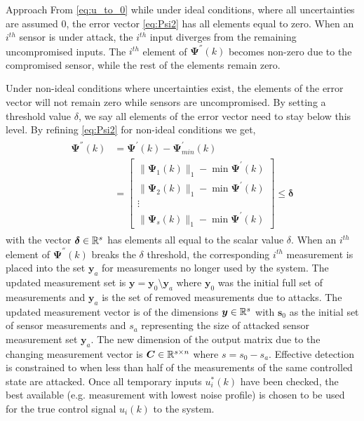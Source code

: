 \begin{section}{Approach}
From \eqref{eq:u_to_0} while under ideal conditions, where all uncertainties are assumed 0, the error vector \eqref{eq:Psi2} has all elements equal to zero. When an $i^{th}$ sensor is under attack, the $i^{th}$ input diverges from the remaining uncompromised inputs. The $i^{th}$ element of $\bm{\Psi}^{''}(k)$ becomes non-zero due to the compromised sensor, while the rest of the elements remain zero. 

Under non-ideal conditions where uncertainties exist, the elements of the error vector will not remain zero while sensors are uncompromised. By setting a threshold value $\delta$, we say all elements of the error vector need to stay below this level. By refining \eqref{eq:Psi2} for non-ideal conditions we get,
    \begin{align}
    \begin{split}
    \label{eq:Psi2_nonideal}
	\bm{\Psi^{''}}(k)&=\bm{\Psi^{'}}(k)-\bm{\Psi}^{'}_{min}(k) \\
	& =\begin{bmatrix} \lVert{\bm{\Psi}_1(k)}\rVert_1 - \min \bm{\Psi}^{'}(k)\\ \lVert{\bm{\Psi}_2(k)}\rVert_1 - \min \bm{\Psi}^{'}(k) \\ \vdots \\ \lVert{\bm{\Psi}_s(k)}\rVert_1 - \min \bm{\Psi}^{'}(k) \end{bmatrix} \leq \bm{\delta}
	\end{split}
	\end{align}
with the vector $\bm{\delta} \in \mathbb{R}^s$ has elements all equal to the scalar value $\delta$. When an $i^{th}$ element of $\bm{\Psi^{''}}(k)$ breaks the $\delta$ threshold, the corresponding $i^{th}$ measurement is placed into the set $\bm{y}_a$ for measurements no longer used by the system. The updated measurement set is $\bm{y}=\bm{y}_0\setminus\bm{y}_a$ where $\bm{y}_0$ was the initial full set of measurements and $\bm{y}_a$ is the set of removed measurements due to attacks. The updated measurement vector is of the dimensions $\bm{y} \in \mathbb{R}^{s}$ with $\bm{s}_0$ as the initial set of sensor measurements and $s_a$ representing the size of attacked sensor measurement set $\bm{y}_a$. The new dimension of the output matrix due to the changing measurement vector is $\bm{C} \in \mathbb{R}^{s\times n}$ where $s=s_0-s_a$. Effective detection is constrained to when less than half of the measurements of the same controlled state are attacked. Once all temporary inputs $u_i^*(k)$ have been checked, the best available (e.g. measurement with lowest noise profile) is chosen to be used for the true control signal $u_i(k)$ to the system.




\end{section}
